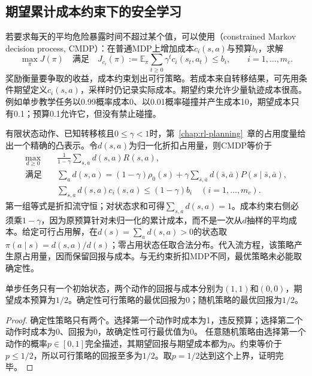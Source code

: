 \subsection{期望累计成本约束下的安全学习}
\label{sec:rl-trustworthy-cmdp}

若要求每天的平均危险暴露时间不超过某个值，可以使用（constrained Markov decision process, CMDP）：在普通MDP上增加成本$c_i(s,a)$与预算$b_i$，求解
\begin{equation}
  \max_\pi J(\pi)
  \quad\text{满足}\quad
  J_{c_i}(\pi):=\mathbb E_\pi\sum_{t\geq0}\gamma^tc_i(s_t,a_t)
       \leq b_i,\qquad i=1,\ldots,m_c.
  \label{eq:rl-trustworthy-cmdp}
\end{equation}
奖励衡量要争取的收益，成本约束划出可行策略。若成本来自转移结果，可先用条件期望定义$c_i(s,a)$，采样时仍记录实际成本。期望约束允许少量轨迹成本很高。例如单步教学任务以0.99概率成本0、以0.01概率碰撞并产生成本10，期望成本只有0.1；预算0.1允许它，但没有禁止碰撞。

有限状态动作、已知转移核且$0\leq\gamma<1$时，第~\ref{chap:rl-planning}~章的占用度量给出一个精确的凸表示。令$d(s,a)$为归一化折扣占用量，则CMDP等价于
\begin{align}
  \max_{d\geq0}\quad&
       \frac{1}{1-\gamma}\sum_{s,a}d(s,a)R(s,a), \nonumber\\
  \text{满足}\quad&
       \sum_a d(s,a)
       =(1-\gamma)\rho_0(s)
          +\gamma\sum_{\bar s,\bar a}d(\bar s,\bar a)
                   P(s\mid\bar s,\bar a), \nonumber\\
  &\sum_{s,a}d(s,a)c_i(s,a)\leq(1-\gamma)b_i
       \quad (i=1,\ldots,m_c).
  \label{eq:rl-trustworthy-cmdp-lp}
\end{align}
第一组等式是折扣流守恒；对状态求和可得$\sum_{s,a}d(s,a)=1$。成本约束右侧必须乘$1-\gamma$，因为原预算针对未归一化的累计成本，而不是一次从$d$抽样的平均成本。给定可行占用解，在$d(s)=\sum_a d(s,a)>0$的状态取
$\pi(a\mid s)=d(s,a)/d(s)$；零占用状态任取合法分布。代入流方程，该策略产生原占用量，因而保留回报与成本。与无约束折扣MDP不同，最优策略未必能取确定性。

\begin{theorem}[约束最优可能需要随机化]
  \label{thm:rl-trustworthy-randomization}
  单步任务只有一个初始状态，两个动作的回报与成本分别为$(1,1)$和$(0,0)$，期望成本预算为$1/2$。确定性可行策略的最优回报为0；随机策略的最优回报为$1/2$。
\end{theorem}
\begin{proof}
  确定性策略只有两个。选择第一个动作时成本为1，违反预算；选择第二个动作时成本为0、回报为0，故确定性可行最优值为0。
  任意随机策略由选择第一个动作的概率$p\in[0,1]$完全描述，其期望回报与期望成本都为$p$。约束等价于$p\leq1/2$，所以可行策略的回报至多为$1/2$。取$p=1/2$达到这个上界，证明完毕。
\end{proof}

